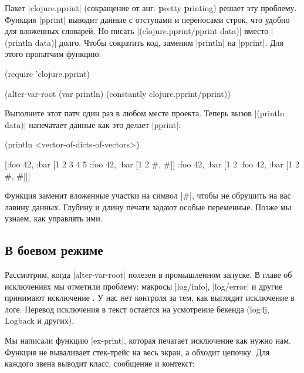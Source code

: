 Пакет \spverb|clojure.pprint| (сокращение от анг. \textbf{p}retty \textbf{p}rinting)
решает эту проблему. Функция \spverb|pprint| выводит данные с отступами и переносами строк,
что удобно для вложенных словарей. Но писать \spverb|(clojure.pprint/pprint data)|
вместо \spverb|(println data)| долго. Чтобы сократить код, заменим \spverb|println|
на \spverb|pprint|. Для этого пропатчим функцию:

\begin{english}
  \begin{clojure}
(require 'clojure.pprint)

(alter-var-root
 (var println)
 (constantly clojure.pprint/pprint))
  \end{clojure}
\end{english}

Выполните этот патч один раз в любом месте проекта. Теперь вызов
\spverb|(println data)| напечатает данные как это делает \spverb|pprint|:

\begin{english}
  \begin{clojure}
(println <vector-of-dicts-of-vectors>)

[{:foo 42, :bar [1 2 3 4 5 {:foo 42, :bar [1 2 {#, #}]}]}
 {:foo 42, :bar [1 2 {:foo 42, :bar [1 2 {#, #}]}]}]
  \end{clojure}
\end{english}

Функция заменит вложенные участки на символ \spverb|#|, чтобы не обрушить на
вас лавину данных. Глубину и длину печати задают особые переменные. Позже мы
узнаем, как управлять ими.

\subsection{В боевом режиме}

\label{install-logger}

Рассмотрим, когда \spverb|alter-var-root| полезен в промышленном запуске. В
главе об исключениях мы отметили проблему: макросы \spverb|log/info|,
\spverb|log/error| и другие принимают исключение . У нас нет
контроля за тем, как выглядит исключение в логе. Перевод исключения в текст
оста\"{е}тся на усмотрение бекенда (log4j, Logback и других).

Мы написали функцию \spverb|ex-print|, которая печатает исключение как нужно
нам. Функция не вываливает стек-трейс на весь экран, а обходит цепочку. Для
каждого звена выводит класс, сообщение и контекст:

